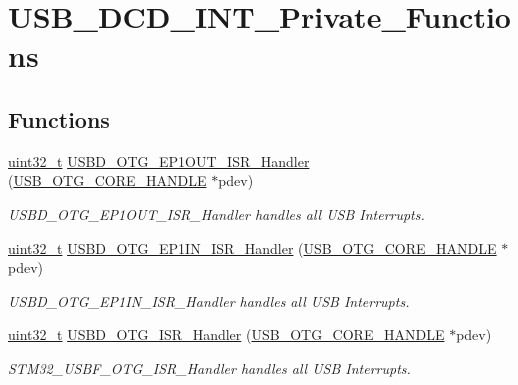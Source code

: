 \hypertarget{group___u_s_b___d_c_d___i_n_t___private___functions}{\section{U\-S\-B\-\_\-\-D\-C\-D\-\_\-\-I\-N\-T\-\_\-\-Private\-\_\-\-Functions}
\label{group___u_s_b___d_c_d___i_n_t___private___functions}
}
\subsection*{Functions}
\begin{DoxyCompactItemize}
\item 
\hyperlink{stdint_8h_a435d1572bf3f880d55459d9805097f62}{uint32\-\_\-t} \hyperlink{group___u_s_b___d_c_d___i_n_t___private___functions_ga678fc2f23c2474b9029bed6ee65baeb4}{U\-S\-B\-D\-\_\-\-O\-T\-G\-\_\-\-E\-P1\-O\-U\-T\-\_\-\-I\-S\-R\-\_\-\-Handler} (\hyperlink{group___u_s_b___c_o_r_e___exported___types_gaf76054c11eb8a3367907aad7ae700e80}{U\-S\-B\-\_\-\-O\-T\-G\-\_\-\-C\-O\-R\-E\-\_\-\-H\-A\-N\-D\-L\-E} $\ast$pdev)
\begin{DoxyCompactList}\small\item\em U\-S\-B\-D\-\_\-\-O\-T\-G\-\_\-\-E\-P1\-O\-U\-T\-\_\-\-I\-S\-R\-\_\-\-Handler handles all U\-S\-B Interrupts. \end{DoxyCompactList}\item 
\hyperlink{stdint_8h_a435d1572bf3f880d55459d9805097f62}{uint32\-\_\-t} \hyperlink{group___u_s_b___d_c_d___i_n_t___private___functions_gad8c7f940c6c0951aa75396c49458c060}{U\-S\-B\-D\-\_\-\-O\-T\-G\-\_\-\-E\-P1\-I\-N\-\_\-\-I\-S\-R\-\_\-\-Handler} (\hyperlink{group___u_s_b___c_o_r_e___exported___types_gaf76054c11eb8a3367907aad7ae700e80}{U\-S\-B\-\_\-\-O\-T\-G\-\_\-\-C\-O\-R\-E\-\_\-\-H\-A\-N\-D\-L\-E} $\ast$pdev)
\begin{DoxyCompactList}\small\item\em U\-S\-B\-D\-\_\-\-O\-T\-G\-\_\-\-E\-P1\-I\-N\-\_\-\-I\-S\-R\-\_\-\-Handler handles all U\-S\-B Interrupts. \end{DoxyCompactList}\item 
\hyperlink{stdint_8h_a435d1572bf3f880d55459d9805097f62}{uint32\-\_\-t} \hyperlink{group___u_s_b___d_c_d___i_n_t___private___functions_ga5d20d4901254494cc809943071149dfa}{U\-S\-B\-D\-\_\-\-O\-T\-G\-\_\-\-I\-S\-R\-\_\-\-Handler} (\hyperlink{group___u_s_b___c_o_r_e___exported___types_gaf76054c11eb8a3367907aad7ae700e80}{U\-S\-B\-\_\-\-O\-T\-G\-\_\-\-C\-O\-R\-E\-\_\-\-H\-A\-N\-D\-L\-E} $\ast$pdev)
\begin{DoxyCompactList}\small\item\em S\-T\-M32\-\_\-\-U\-S\-B\-F\-\_\-\-O\-T\-G\-\_\-\-I\-S\-R\-\_\-\-Handler handles all U\-S\-B Interrupts. \end{DoxyCompactList}\end{DoxyCompactItemize}


